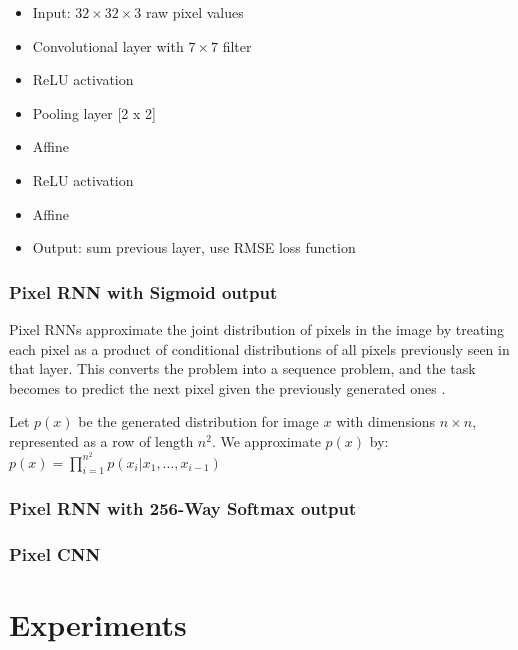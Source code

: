 \documentclass[10pt,twocolumn,letterpaper]{article}
\begin{document}
\begin{itemize}
\item Input: $32  \times  32  \times  3$ raw pixel values
\item Convolutional layer with $7  \times  7$ filter
\item ReLU activation
\item Pooling layer [2 x 2]
\item Affine
\item ReLU activation
\item Affine
\item Output: sum previous layer, use RMSE loss function
\end{itemize}

\subsubsection{Pixel RNN with Sigmoid output}
Pixel RNNs approximate the joint distribution of pixels in the image by treating each pixel as a product of conditional distributions of all pixels previously seen in that layer.  This converts the problem into a sequence problem, and the task becomes to predict the next pixel given the previously generated ones \cite{pixelRNN}. 

Let $p(x)$ be the generated distribution for image $x$ with dimensions $n \times n$, represented as a row of length $n^2$. We approximate $p(x)$ by: \\
$p(x) = \prod_{i=1}^{n^2} p(x_i | x_1, ... , x_{i-1} )$

\subsubsection{Pixel RNN with 256-Way Softmax output}



\subsubsection{Pixel CNN}




\section{Experiments} 
\end{document}
